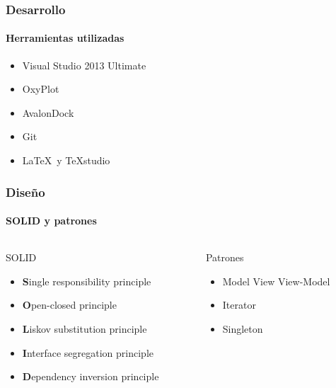 \begin{frame}
	\frametitle{Desarrollo}
	\framesubtitle{Herramientas utilizadas}
	
	\begin{itemize}
		\item Visual Studio 2013 Ultimate
		\item OxyPlot
		\item AvalonDock
		\item Git
		\item \LaTeX \ y TeXstudio
	\end{itemize}
\end{frame}

\begin{frame}
	\frametitle{Dise\~no}
	\framesubtitle{SOLID y patrones}
	\begin{columns}[T]
		
		\begin{column}[T]{0.5\linewidth}
			\begin{block}{SOLID}
				\begin{itemize}
					\item \textbf{S}ingle responsibility principle
					\item \textbf{O}pen-closed principle
					\item \textbf{L}iskov substitution principle
					\item \textbf{I}nterface segregation principle
					\item \textbf{D}ependency inversion principle
				\end{itemize}
			\end{block}
		\end{column}
		
		\begin{column}[T]{0.5\linewidth}
			\begin{block}{Patrones}
				\begin{itemize}
					\item Model View View-Model
					\item Iterator
					\item Singleton
				\end{itemize}
			\end{block}
		\end{column}
		
	\end{columns}

\end{frame}

